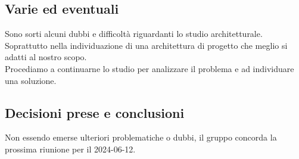 \documentclass[italian,12pt]{article}
\begin{document}
\subsection{Varie ed eventuali}
Sono sorti alcuni dubbi e difficoltà riguardanti lo studio architetturale. Soprattutto nella individuazione di una architettura di progetto che meglio si adatti al nostro scopo. \\
Procediamo a continuarne lo studio per analizzare il problema e ad individuare una soluzione.

\subsection{Decisioni prese e conclusioni}
Non essendo emerse ulteriori problematiche o dubbi, il gruppo concorda la prossima riunione per il 2024-06-12.
\end{document}

